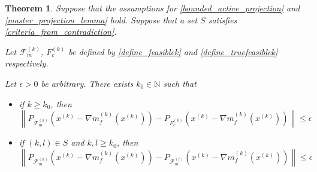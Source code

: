 \documentclass{article}
\newtheorem{theorem}{Theorem}[section]
\theoremstyle{case}
\numberwithin{theorem}{subsection}
\newcommand{\feasiblek}{{\mathcal F_m^{(k)}}}
\newcommand{\feasiblel}{{\mathcal F_m^{(l)}}}
\newcommand{\gk}{{\nabla m_f^{(k)}\left(\xk\right)}}
\newcommand{\naturals}{\mathbb N}
\newcommand{\xk}{x^{(k)}}
\newcommand{\truefeasiblek}{{F_c^{(k)}}}
\begin{document}
\begin{theorem}
\label{bounded_projection_theorem}
Suppose that the assumptions for
\cref{bounded_active_projection} and \cref{master_projection_lemma}
hold.
Suppose that a set $S$ satisfies \cref{criteria_from_contradiction}.

Let $\feasiblek$, $\truefeasiblek$ be defined by \cref{define_feasiblek} and \cref{define_truefeasiblek} respectively.

Let $\epsilon > 0$ be arbitrary.
There exists $k_0 \in \naturals$ such that 
\begin{itemize}
\item if $k \ge k_0$, then
$\left\| P_{\feasiblek}\left(\xk - \gk\right) - P_{\truefeasiblek}\left(\xk - \gk\right) \right\| \le \epsilon$
\item if $(k, l) \in S$ and $k,l \ge k_0$, then
$\left\| P_{\feasiblek}\left(\xk - \gk\right) - P_{\feasiblel}\left(\xk - \gk\right) \right\| \le \epsilon$
\end{itemize}
\end{theorem}
\end{document}
